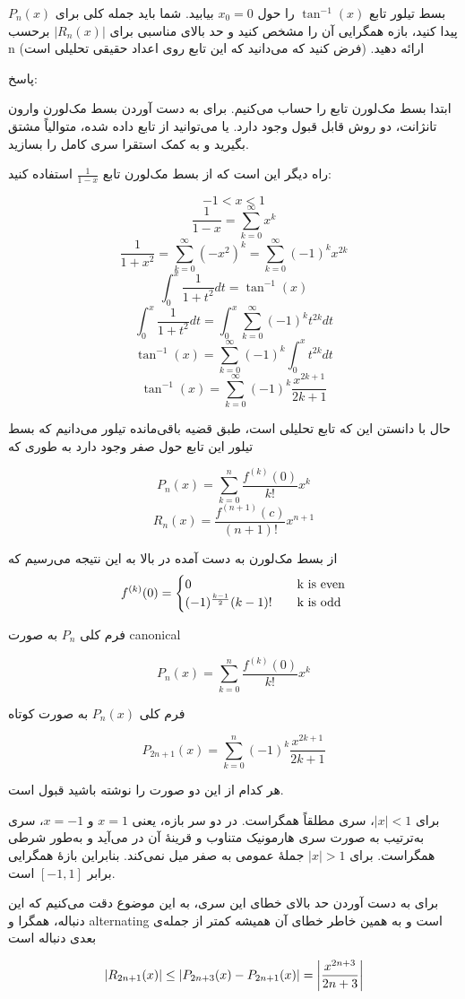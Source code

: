بسط تیلور تابع 
$\tan^{-1} (x)$
را حول 
$x_0 = 0$
بیابید. شما باید جمله کلی برای 
$P_n(x)$
پیدا کنید، بازه همگرایی آن را مشخص کنید و حد بالای مناسبی برای 
$|R_n(x)|$
برحسب n ارائه دهید. (فرض کنید که می‌دانید که این تابع روی اعداد حقیقی تحلیلی است)

پاسخ:

ابتدا بسط مک‌لورن تابع را حساب می‌کنیم.
برای به دست آوردن بسط مک‌لورن وارون تانژانت، دو روش قابل قبول وجود دارد. یا می‌توانید از تابع داده شده، متوالیاً مشتق بگیرید و به کمک استقرا سری کامل را بسازید.

راه دیگر این است که از بسط مک‌لورن تابع $\frac{1}{1-x}$ استفاده کنید:

$$-1 < x < 1$$
$$\frac{1}{1-x} = \sum_{k=0}^{\infty} x^k$$
$$\frac{1}{1+x^2} = \sum_{k=0}^{\infty} (-x^2) ^k = \sum_{k=0}^{\infty} (-1)^k x^{2k}$$
$$\int_{0}^{x} \frac{1}{1+t^2}dt = \tan^{-1}(x)$$
$$\int_{0}^{x} \frac{1}{1+t^2}dt = \int_{0}^{x} \sum_{k=0}^{\infty} (-1)^k t^{2k} dt$$
$$\tan^{-1}(x) = \sum_{k=0}^{\infty} (-1)^k \int_{0}^{x} t^{2k} dt$$
$$\tan^{-1}(x) = \sum_{k=0}^{\infty} (-1)^k \frac{x^{2k+1}}{2k+1}$$

حال با دانستن این که تابع تحلیلی است، طبق قضیه باقی‌مانده تیلور می‌دانیم که بسط تیلور این تابع حول صفر وجود دارد به طوری که 

$$P_n(x) = \sum_{k=0}^{n} \frac{f^{(k)}(0)}{k!} x^k$$
$$R_n(x) = \frac{f^{(n+1)}(c)}{(n+1)!} x^{n+1}$$

از بسط مک‌لورن به دست آمده در بالا به این نتیجه می‌رسیم که
\[
f^{(k)}(0) = 
                \begin{cases}
                    \text{0} &\quad \text{k is even} \cr
                    (-1)^{\frac{k-1}{2}} (k-1)! &\quad \text{k is odd}
                \end{cases}
\]

فرم کلی $P_n$ به صورت canonical

$$P_n(x) = \sum_{k=0}^{n} \frac{f^{(k)}(0)}{k!}x^k$$

فرم کلی $P_n(x)$ به صورت کوتاه

$$P_{2n+1}(x) = \sum_{k=0}^{n} (-1)^k \frac{x^{2k+1}}{2k+1}$$

هر کدام از این دو صورت را نوشته باشید قبول است.

برای \(|x|<1\)، سری مطلقاً همگراست. در دو سر بازه، یعنی
\(x=1\)
و
\(x=-1\)،
سری به‌ترتیب به صورت سری هارمونیک متناوب و قرینهٔ آن در می‌آید و به‌طور شرطی همگراست. برای
\(|x|>1\)
جملهٔ عمومی به صفر میل نمی‌کند. بنابراین بازهٔ همگرایی برابر
\([-1,1]\)
است.

برای به دست آوردن حد بالای خطای این سری، به این موضوع دقت می‌کنیم که این دنباله، همگرا و alternating است و به همین خاطر خطای آن همیشه کمتر از جمله‌ی بعدی دنباله است

$$|R_{2n+1}(x)| \leq |P_{2n+3}(x) - P_{2n+1}(x)| = \abs{\frac{x^{2n+3}}{2n+3}}$$


